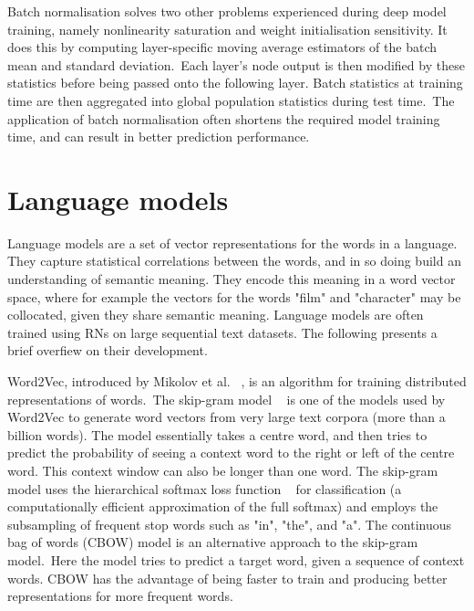 \noindent Batch normalisation solves two other problems experienced during deep model training, namely nonlinearity saturation and weight initialisation sensitivity. It does this by computing layer-specific moving average estimators of the batch mean and standard deviation.\ Each layer's node output is then modified by these statistics before being passed onto the following layer. Batch statistics at training time are then aggregated into global population statistics during test time.\ The application of batch normalisation often shortens the required model training time, and can result in better prediction performance. 



\section{Language models}

\noindent Language models are a set of vector representations for the words in a language. They capture statistical correlations between the words, and in so doing build an understanding of semantic meaning. They encode this meaning in a word vector space, where for example the vectors for the words "film" and "character" may be collocated, given they share semantic meaning. Language models are often trained using RNs on large sequential text datasets. The following presents a brief overfiew on their development. \par

\noindent Word2Vec, introduced by Mikolov et al. \unskip~\citep{mikolov2013distributed}, is an algorithm for training distributed representations of words.\ The skip-gram model \unskip ~\citep{mikolov2013efficient} is one of the models used by Word2Vec to generate word vectors from very large text corpora (more than a billion words). The model essentially takes a centre word, and then tries to predict the probability of seeing a context word to the right or left of the centre word. This context window can also be longer than one word. The skip-gram model uses the hierarchical softmax loss function \unskip~\citep{morin2005hierarchical} for classification (a computationally efficient approximation of the full softmax) and employs the subsampling of frequent stop words such as "in", "the", and "a". The continuous bag of words (CBOW) model is an alternative approach to the skip-gram model.\ Here the model tries to predict a target word, given a sequence of context words. CBOW has the advantage of being faster to train and producing better representations for more frequent words. \par


